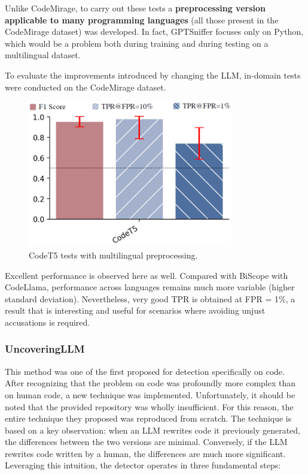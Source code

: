 Unlike CodeMirage, to carry out these tests a \textbf{preprocessing 
version applicable to many programming languages} (all those present in 
the CodeMirage dataset) was developed. In fact, GPTSniffer focuses only on 
Python, which would be a problem both during training and during testing on 
a multilingual dataset.

To evaluate the improvements introduced by changing the LLM, in-domain tests 
were conducted on the CodeMirage dataset.
\begin{figure}[H]
    \centering
    \includegraphics[width=0.8\textwidth]{img/CodeT5/default.png}
    \caption{CodeT5 tests with multilingual preprocessing.}
    \label{fig:CodeT5 tests with multilingual preprocessing}
\end{figure}

Excellent performance is observed here as well. Compared with BiScope 
with CodeLlama, performance across languages remains much more variable 
(higher standard deviation). Nevertheless, very good TPR is obtained at FPR = 1\%, 
a result that is interesting and useful for scenarios where avoiding unjust 
accusations is required.



\subsubsection{UncoveringLLM}
This method was one of the first proposed for detection specifically on code. 
After recognizing that the problem on code was profoundly more complex than on 
human code, a new technique was implemented. Unfortunately, it should be noted 
that the provided repository was wholly insufficient. For this reason, the entire 
technique they proposed was reproduced from scratch.
The technique is based on a key observation: when an LLM rewrites code it previously 
generated, the differences between the two versions are minimal. Conversely, if the 
LLM rewrites code written by a human, the differences are much more significant. 
Leveraging this intuition, the detector operates in three fundamental steps:

